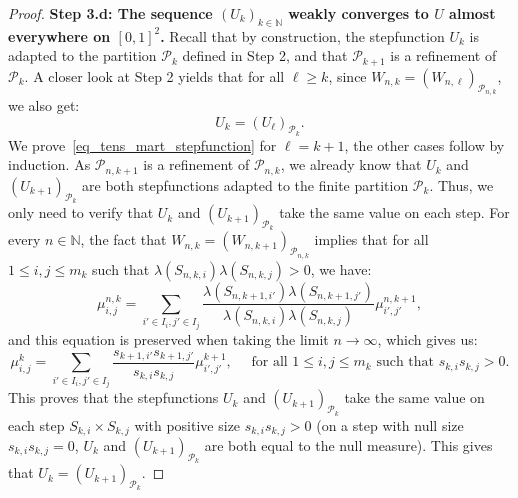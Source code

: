 \documentclass{amsart}
\theoremstyle{plain}
\theoremstyle{definition}
\newcommand{\cp}{\mathcal{P}}
\newcommand{\cP}{\mathcal{P}}
\newcommand{\N}{\mathbb{N}}
\begin{document}
\begin{proof}
\textbf{Step 3.d: The sequence $(U_k )_{k\in\N} $ weakly converges  to $U$ almost
everywhere on $[0, 1]^2$.}  Recall that  by construction, the stepfunction $U_k$
is  adapted  to the  partition  $\cp_k$  defined  in  Step 2,  and  that
$\cp_{k+1}$  is  a refinement  of  $\cp_k$.  A  closer  look at  Step  2
yields    that    for   all    $\ell\geq    k$,    since
$W_{n,k} = (W_{n,\ell})_{\cP_{n,k}}$, we also get:
\begin{equation}\label{eq_tens_mart_stepfunction}
 U_k = (U_\ell)_{\cP_{k}} .
\end{equation}
We prove~\eqref{eq_tens_mart_stepfunction}
for $\ell = k+1$, the other cases follow by induction.
As $\cP_{n,k+1}$ is a refinement of $\cP_{n,k}$,
	we already know that $U_k$ and $(U_{k+1})_{\cP_k}$
	are both stepfunctions adapted to the finite partition $\cP_k$.
Thus, we only need to verify that $U_k$ and $(U_{k+1})_{\cP_k}$
	take the same value on each step.
For every $n\in\N$, the fact that $W_{n,k} = (W_{n,k+1})_{\cP_{n,k}}$
implies that for all $1\leq i,j \leq m_k$ 
	such that $\lambda(S_{n,k,i}) \lambda(S_{n,k,j})>0$,
	we have:
\[ \mu_{i,j}^{n,k} = \sum_{i' \in I_i, j'\in I_j} 
			\frac{\lambda(S_{n,k+1,i'}) \lambda(S_{n,k+1,j'})}
				{\lambda(S_{n,k,i}) \lambda(S_{n,k,j})}
			\mu_{i',j'}^{n,k+1} 
, \]
and this equation is preserved when taking the limit $n\to\infty$, which gives us:
\[ \mu_{i,j}^{k} = \sum_{i' \in I_i, j'\in I_j} 
			\frac{s_{k+1,i'} s_{k+1,j'}}
				{s_{k,i} s_{k,j}}
			\mu_{i',j'}^{k+1} 
, \quad \text{ for all $1\leq i,j \leq m_k$ such that $s_{k,i} s_{k,j} >0$}
. \]
This proves that the stepfunctions $U_k$ and $(U_{k+1})_{\cP_k}$
take the same value on each step $S_{k,i} \times S_{k,j}$
	with positive size $s_{k,i} s_{k,j} > 0$
(on a step with null size $s_{k,i} s_{k,j} = 0$,
	$U_k$ and $(U_{k+1})_{\cP_k}$
	are both equal to the null measure).
This gives  that $ U_k = (U_{k+1})_{\cP_{k}}$.



\end{proof}
\end{document}
